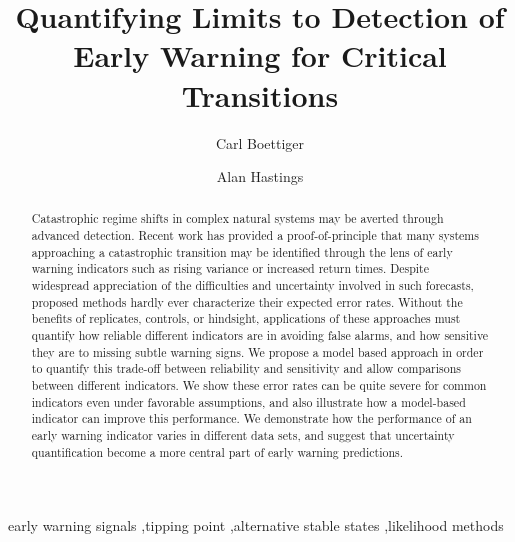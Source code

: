 \documentclass[authoryear,review,11pt]{elsarticle}
\begin{document}

\begin{frontmatter}
  \title{Quantifying Limits to Detection of Early Warning for Critical Transitions}
  \author[cpb]{Carl Boettiger}
  \author[esp]{Alan Hastings}
  \address[cpb]{Center for Population Biology, 1 Shields Avenue, University of California, Davis, CA, 95616 United States.}
  \address[esp]{Department of Environmental Science and Policy, University of California, Davis, CA, 95616 United States}


  \begin{abstract}

Catastrophic regime shifts in complex natural systems may be averted through advanced detection.
Recent work has provided a proof-of-principle that many systems approaching a catastrophic transition may be identified
through the lens of early warning indicators such as rising variance or increased return times.
Despite widespread appreciation of the difficulties and uncertainty involved in such forecasts,
proposed methods hardly ever characterize their expected error rates. 
Without the benefits of replicates, controls, or hindsight, 
applications of these approaches must quantify how reliable different indicators are in avoiding false alarms,
and how sensitive they are to missing subtle warning signs.
We propose a model based approach in order to quantify this trade-off between reliability and sensitivity
and allow comparisons between different indicators.
We show these error rates can be quite severe for common indicators even under favorable assumptions,
and also illustrate how a model-based indicator can improve this performance. 
We demonstrate how the performance of an early warning indicator varies in different data sets, 
and suggest that uncertainty quantification become a more central part of early warning predictions.  
  \end{abstract}

  \begin{keyword}
early warning signals \sep tipping point \sep alternative stable states \sep likelihood methods
   \end{keyword}
 \end{frontmatter}
\end{document}
